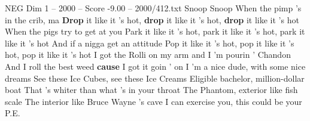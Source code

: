 \begin{textsample}{NEG Dim 1 – 2000 – Score -9.00 – 2000/412.txt}  \label{ex:f1_neg_010}
Snoop Snoop When the pimp 's in the crib, ma \textbf{Drop} it like it 's hot, \textbf{drop} it like it 's hot, \textbf{drop} it like it 's hot When the pigs try to get at you Park it like it 's hot, park it like it 's hot, park it like it 's hot And if a nigga get an attitude Pop it like it 's hot, pop it like it 's hot, pop it like it 's hot I got the Rolli on my arm and I 'm pourin ' Chandon And I roll the best weed \textbf{cause} I got it goin ' on I 'm a nice dude, with some nice dreams See these Ice Cubes, see these Ice Creams Eligible bachelor, million-dollar boat That 's whiter than what 's in your throat The Phantom, exterior like fish scale The interior like Bruce Wayne 's cave I can exercise you, this could be your P.E.

\end{textsample}
